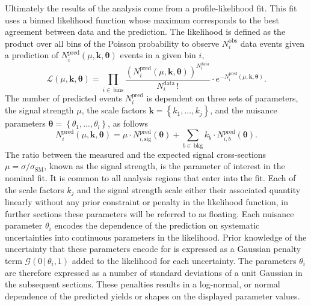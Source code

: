 Ultimately the results of the analysis come from a profile-likelihood fit. This
fit uses a binned likelihood function whose maximum corresponds to the best
agreement between data and the prediction. The likelihood is defined as the
product over all bins of the Poisson probability to observe $N^{\text{obs}}_i$
data events given a prediction of $N^{\text{pred}}_i(\mu,\bm{k},{\bm\theta})$
events in a given bin $i$,
\begin{equation} \mathcal{L}(\mu,{\bm{k},\bm{\theta}}) =
\prod_{i\in\,\text{bins}} \frac{\left( N_{i}^{\text{pred}}(\mu,{\bm{k,\theta}})
\right)^{N_{i}^{\text{data}}}}{N_{i}^{\text{data}}\,!} \cdot
e^{-N_{i}^{\text{pred}}(\mu,{\bm{k,\theta}})}.
  \label{eq:likelihood}
\end{equation} The number of predicted events $N^{\text{pred}}_i$ is dependent
on three sets of parameters, the signal strength $\mu$, the scale factors
$\bm{k}=\left\{k_1, ...,k_j\right\}$, and the nuisance parameters $\bm{\theta} =
\left\{\theta_1,...,\theta_l\right\}$, as follows
\begin{equation} N_{i}^{\text{pred}}(\mu,\bm{k},\bm{\theta}) = \mu \cdot
N_{i,\text{sig}}^{\text{pred}}(\bm{\theta}) + \sum_{b\in\,\text{bkg}} k_b\cdot
N_{i,b}^{\text{pred}}(\bm{\theta}).
\end{equation} The ratio between the measured and the expected signal
cross-sections $\mu=\sigma/\sigma_{\text{SM}}$, known as the signal strength, is
the parameter of interest in the nominal fit. It is common to all analysis
regions that enter into the fit. Each of the scale factors $k_j$ and the signal
strength scale either their associated quantity linearly without any prior
constraint or penalty in the likelihood function, in further sections these
parameters will be referred to as floating. Each nuisance parameter $\theta_i$
encodes the dependence of the prediction on systematic uncertainties into
continuous parameters in the likelihood. Prior knowledge of the uncertainty that
these parameters encode for is expressed as a Gaussian penalty term
$\mathcal{G}(0\,|\,\theta_i,1)$ added to the likelihood for each uncertainty.
The parameters $\theta_i$ are therefore expressed as a number of standard
deviations of a unit Gaussian in the subsequent sections. These penalties
results in a log-normal, or normal dependence of the predicted yields or shapes
on the displayed parameter values.

